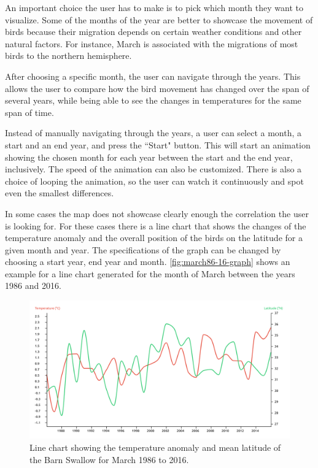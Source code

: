 \documentclass[journal]{vgtc}                %
\begin{document}
An important choice the user has to make is to pick which month they want to visualize. Some of the months of the year are better to showcase the movement of birds because their migration depends on certain weather conditions and other natural factors. For instance, March is associated with the migrations of most birds to the northern hemisphere.

After choosing a specific month, the user can navigate through the years. This allows the user to compare how the bird movement has changed over the span of several years, while being able to see the changes in temperatures for the same span of time.

Instead of manually navigating through the years, a user can select a month, a start and an end year, and press the ``Start" button. This will start an animation showing the chosen month for each year between the start and the end year, inclusively. The speed of the animation can also be customized. There is also a choice of looping the animation, so the user can watch it continuously and spot even the smallest differences.

In some cases the map does not showcase clearly enough the correlation the user is looking for. For these cases there is a line chart that shows the changes of the temperature anomaly and the overall position of the birds on the latitude for a given month and year. The specifications of the graph can be changed by choosing a start year, end year and month. \autoref{fig:march86-16-graph} shows an example for a line chart generated for the month of March between the years 1986 and 2016.

\begin{figure}[t]
  \centering
  \includegraphics[width=\linewidth]{march86-16-graph-barnswallow}
  \caption{Line chart showing the temperature anomaly and mean latitude of the Barn Swallow for March 1986 to 2016.}
  \label{fig:march86-16-graph}
\end{figure}
\end{document}
